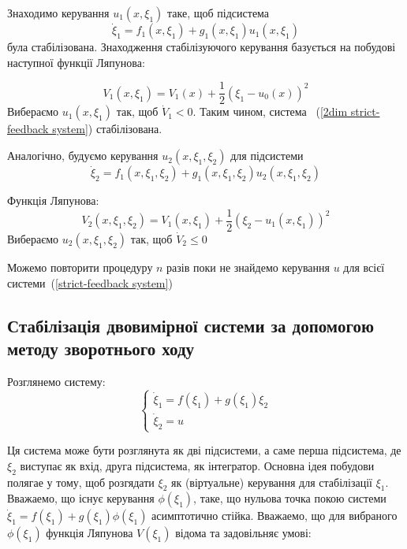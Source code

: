 \documentclass{article}
\begin{document}
Знаходимо керування $u_1(x,\xi_1)$ таке, щоб підсистема
\begin{equation}
    \dot \xi_1 = f_1(x,\xi_1)+g_1(x,\xi_1)u_1(x,\xi_1)
\end{equation}
була стабілізована. Знаходження стабілізуючого керування базується на побудові наступної функції Ляпунова:

\begin{equation}
V_{1}(x,\xi_1)=V_{1}(x)+{\frac{1}{2}}(\xi_1-u_{0}(x))^{2}
\end{equation}
Вибераємо $u_1(x,\xi_1)$ так, щоб $\dot V_{1} < 0$.
Таким чином, система ~(\ref{2dim strict-feedback system}) стабілізована.
 
Аналогічно, будуємо керування $u_{2}(x,\xi_{1},\xi_{2})$
для підсистеми 
\begin{equation*}
    \dot \xi_2 = f_1(x,\xi_1,\xi_2)+g_1(x, \xi_1, \xi_2)u_2(x,\xi_1, \xi_2)
\end{equation*} 

Функція Ляпунова:
\begin{equation*}
    V_{2}(x,\xi_{1}, \xi_{2})=V_{1}(x,\xi_{1})+{\frac {1}{2}}(\xi_{2}-u_{1}(x,\xi_{1}))^{2}
\end{equation*}
Вибераємо $u_2(x,\xi_1, \xi_2)$ так, щоб $\dot V_{2} \le 0$

Можемо повторити процедуру $n$ разів поки не знайдемо керування $u$ для всієї системи~(\ref{strict-feedback system})

\pagebreak



\subsection{Стабілізація двовимірної системи за допомогою методу зворотнього ходу}
Розглянемо систему:
\begin{equation}
	\begin{cases}
		\dot \xi_1 = f(\xi_1) + g(\xi_1)\xi_2 \\
		\dot\xi_2 = u
	\end{cases}
\end{equation}

Ця система може бути розглянута як дві підсистеми, а саме перша підсистема, де $\xi_2$ виступає як вхід, друга
підсистема, як інтегратор. Основна ідея побудови полягае у тому, щоб розгядати $\xi_2$ як (віртуальне) керування для
стабілізації $\xi_1$. Вважаемо, що існує керування $\phi(\xi_1)$, таке, що нульова точка покою
системи $\dot \xi_1 = f(\xi_1) + g(\xi_1)\phi(\xi_1)$
асимптотично стійка.
Вважаемо, що для вибраного $\phi(\xi_1)$ функція Ляпунова $V(\xi_1)$  відома та задовільняє умові:
\end{document}
